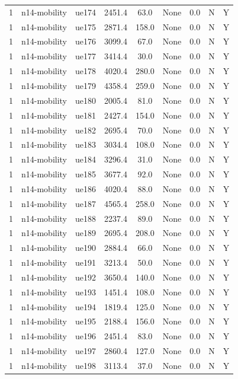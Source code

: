 \begin{table}[ht]
\begin{tabular}{|c|c|c|c|c|c|c|c|c|}
1 & n14-mobility & ue174 & 2451.4 & 63.0 & None & 0.0 & N & Y \\
1 & n14-mobility & ue175 & 2871.4 & 158.0 & None & 0.0 & N & Y \\
1 & n14-mobility & ue176 & 3099.4 & 67.0 & None & 0.0 & N & Y \\
1 & n14-mobility & ue177 & 3414.4 & 30.0 & None & 0.0 & N & Y \\
1 & n14-mobility & ue178 & 4020.4 & 280.0 & None & 0.0 & N & Y \\
1 & n14-mobility & ue179 & 4358.4 & 259.0 & None & 0.0 & N & Y \\
1 & n14-mobility & ue180 & 2005.4 & 81.0 & None & 0.0 & N & Y \\
1 & n14-mobility & ue181 & 2427.4 & 154.0 & None & 0.0 & N & Y \\
1 & n14-mobility & ue182 & 2695.4 & 70.0 & None & 0.0 & N & Y \\
1 & n14-mobility & ue183 & 3034.4 & 108.0 & None & 0.0 & N & Y \\
1 & n14-mobility & ue184 & 3296.4 & 31.0 & None & 0.0 & N & Y \\
1 & n14-mobility & ue185 & 3677.4 & 92.0 & None & 0.0 & N & Y \\
1 & n14-mobility & ue186 & 4020.4 & 88.0 & None & 0.0 & N & Y \\
1 & n14-mobility & ue187 & 4565.4 & 258.0 & None & 0.0 & N & Y \\
1 & n14-mobility & ue188 & 2237.4 & 89.0 & None & 0.0 & N & Y \\
1 & n14-mobility & ue189 & 2695.4 & 208.0 & None & 0.0 & N & Y \\
1 & n14-mobility & ue190 & 2884.4 & 66.0 & None & 0.0 & N & Y \\
1 & n14-mobility & ue191 & 3213.4 & 50.0 & None & 0.0 & N & Y \\
1 & n14-mobility & ue192 & 3650.4 & 140.0 & None & 0.0 & N & Y \\
1 & n14-mobility & ue193 & 1451.4 & 108.0 & None & 0.0 & N & Y \\
1 & n14-mobility & ue194 & 1819.4 & 125.0 & None & 0.0 & N & Y \\
1 & n14-mobility & ue195 & 2188.4 & 156.0 & None & 0.0 & N & Y \\
1 & n14-mobility & ue196 & 2451.4 & 83.0 & None & 0.0 & N & Y \\
1 & n14-mobility & ue197 & 2860.4 & 127.0 & None & 0.0 & N & Y \\
1 & n14-mobility & ue198 & 3113.4 & 37.0 & None & 0.0 & N & Y \\

\end{tabular}
\end{table}
